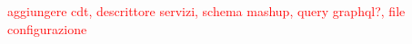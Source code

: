 \textcolor{red}{aggiungere cdt, descrittore servizi, schema mashup, query graphql?, file configurazione}
